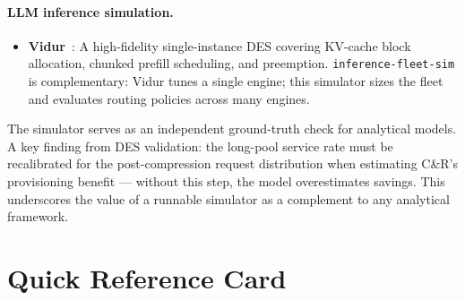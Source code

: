 \documentclass[11pt,a4paper]{article}
\begin{document}
\paragraph{LLM inference simulation.}
\begin{itemize}[nosep]
  \item \textbf{Vidur}~\citep{vidur2024}:
    A high-fidelity single-instance DES covering KV-cache block
    allocation, chunked prefill scheduling, and preemption.
    \texttt{inference-fleet-sim} is complementary: Vidur tunes a single
    engine; this simulator sizes the fleet and evaluates routing policies
    across many engines.
\end{itemize}

The simulator serves as an independent ground-truth check for analytical
models.  A key finding from DES validation: the long-pool service rate
must be recalibrated for the post-compression request distribution when
estimating C\&R's provisioning benefit --- without this step, the model
overestimates savings.  This underscores the value of a runnable
simulator as a complement to any analytical framework.

\section{Quick Reference Card}
\label{sec:quickref}
\end{document}
